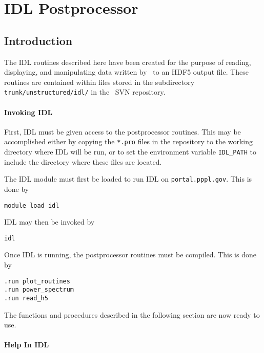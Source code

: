 \newcommand{\IDLf}[1]{\texttt{\textbf{#1}}}
\newcommand{\IDLa}[1]{\textit{#1}}
\newcommand{\IDLbool}{\texttt{bool}}
\newcommand{\IDLint}{\texttt{int}}
\newcommand{\IDLstr}{\texttt{string}}
\newcommand{\IDLflt}{\texttt{float}}
\newcommand{\IDLopt}[1]{$\langle$ #1 $\rangle$}

\chapter{IDL Postprocessor}

\section{Introduction}

The IDL routines described here have been created for the purpose of
reading, displaying, and manipulating data written by \codename\ to an
HDF5 output file.  These routines are contained within files stored in
the subdirectory \texttt{trunk/unstructured/idl/} in the \codename\ SVN
repository.

\subsubsection{Invoking IDL}

First, IDL must be given access to the postprocessor routines.  This
may be accomplished either by copying the \texttt{*.pro} files in the
repository to the working directory where IDL will be run, or to set
the environment variable \texttt{IDL\_PATH} to include the directory
where these files are located.

The IDL module must first be loaded to run IDL on
\texttt{portal.pppl.gov}.  This is done by
\begin{verbatim}
module load idl
\end{verbatim}
IDL may then be invoked by
\begin{verbatim}
idl
\end{verbatim}
Once IDL is running, the postprocessor routines must be compiled.
This is done by
\begin{verbatim}
.run plot_routines
.run power_spectrum
.run read_h5
\end{verbatim}
The functions and procedures described in the following section are
now ready to use.

\subsubsection{Help In IDL}

